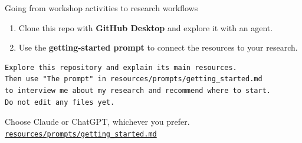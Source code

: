 \begin{frame}[fragile]{Going from workshop activities to research workflows}
  \vfill
  \begin{enumerate}\small\setlength\itemsep{0.5em}
    \item Clone this repo with \textbf{GitHub Desktop} and explore it with an agent.
    \item Use the \textbf{getting-started prompt} to connect the resources to your research.
  \end{enumerate}
  \vspace{0.4em}
  \begin{lstlisting}[basicstyle=\ttfamily\small]
Explore this repository and explain its main resources.
Then use "The prompt" in resources/prompts/getting_started.md
to interview me about my research and recommend where to start.
Do not edit any files yet.
  \end{lstlisting}
  \begin{center}\small
    Choose Claude or ChatGPT, whichever you prefer.\\[0.3em]
    \href{https://github.com/dowlinglab/claude-for-researchers/blob/main/resources/prompts/getting_started.md}{\texttt{resources/prompts/getting\_started.md}}
  \end{center}
  \vspace{0.8cm plus 1fill}
\end{frame}
